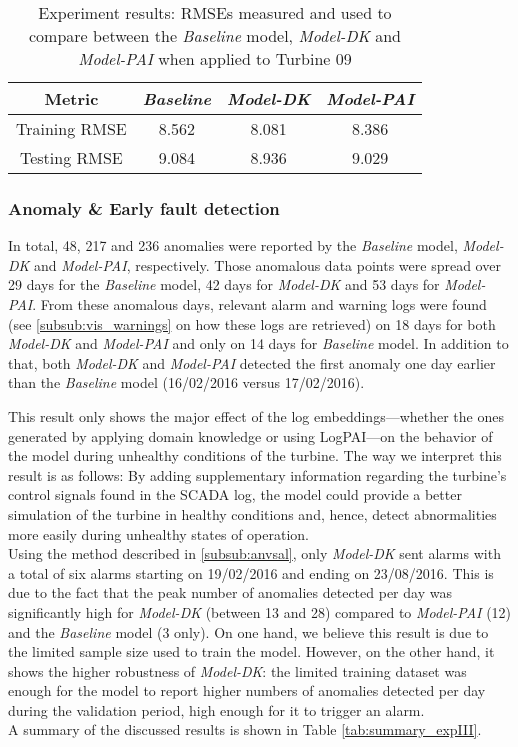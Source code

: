 \begin{table}[H]
    \centering
\begin{tabular}{|c|c|c|c|}
\hline
     \textbf{Metric} & \textbf{\emph{Baseline}} & \textbf{\emph{Model-DK}} & \textbf{\emph{Model-PAI}}\\
     \hline
     Training RMSE & 8.562 & 8.081 & 8.386\\
     \hline
     Testing RMSE & 9.084 & 8.936 & 9.029\\
\hline
\end{tabular}
\caption{Experiment results: RMSEs measured and used to compare between the \emph{Baseline} model, \emph{Model-DK} and \emph{Model-PAI} when applied to Turbine 09}
    \label{tab:Experiment III results}
\end{table}

\subsubsection{Anomaly \& Early fault detection}
In total, 48, 217 and 236 anomalies were reported by the \emph{Baseline} model, \emph{Model-DK} and \emph{Model-PAI}, respectively.
Those anomalous data points were spread over 29 days for the \emph{Baseline} model, 42 days for \emph{Model-DK} and 53 days for \emph{Model-PAI}.
From these anomalous days, relevant alarm and warning logs were found (see \ref{subsub:vis_warnings} on how these logs are retrieved) on 18 days for both \emph{Model-DK} and \emph{Model-PAI} and only on 14 days for \emph{Baseline} model.
In addition to that, both \emph{Model-DK} and \emph{Model-PAI} detected the first anomaly one day earlier than the \emph{Baseline} model (16/02/2016 versus 17/02/2016).

This result only shows the major effect of the log embeddings---whether the ones generated by applying domain knowledge or using LogPAI---on the behavior of 
the model during unhealthy conditions of the turbine. The way we interpret this result is as follows: By adding supplementary information regarding the turbine's control signals
found in the SCADA log, the model could provide a better simulation of the turbine in healthy conditions and, hence, detect abnormalities more easily
during unhealthy states of operation.\\
Using the method described in \ref{subsub:anvsal}, only \emph{Model-DK} sent alarms with a total of six alarms starting on 19/02/2016 and ending on 23/08/2016.
This is due to the fact that the peak number of anomalies detected per day was significantly high for \emph{Model-DK} (between 13 and 28) 
compared to \emph{Model-PAI} (12) and the \emph{Baseline} model (3 only). 
On one hand, we believe this result is due to the limited sample size used to train the model. 
However, on the other hand, it shows the higher robustness of \emph{Model-DK}: the limited training dataset was enough for the model 
to report higher numbers of anomalies detected per day during the validation period, high enough for it to trigger an alarm.\\
A summary of the discussed results is shown in Table \ref{tab:summary_expIII}.

